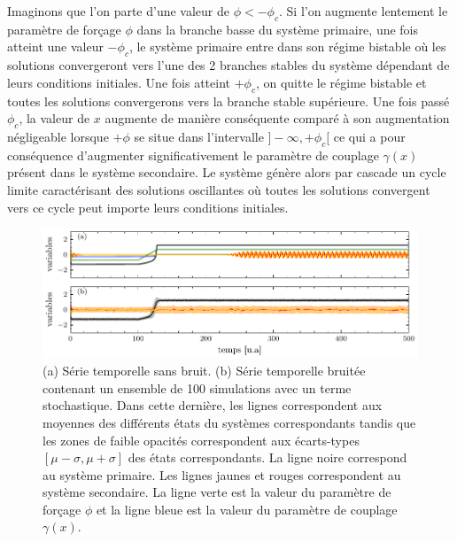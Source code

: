 
Imaginons que l’on parte d’une valeur de $\phi < - \phi_c$. Si l’on augmente lentement le paramètre de forçage $\phi$ dans la branche basse du système primaire, une fois atteint une valeur $-\phi_c$, le système primaire entre dans son régime bistable où les solutions convergeront vers l’une des 2 branches stables du système dépendant de leurs conditions initiales. Une fois atteint $+\phi_c$, on quitte le régime bistable et toutes les solutions convergerons vers la branche stable supérieure. Une fois passé $\phi_c$, la valeur de $x$ augmente de manière conséquente comparé à son augmentation négligeable lorsque $+\phi$ se situe dans l’intervalle $]-\infty, +\phi_c[$ ce qui a pour conséquence d’augmenter significativement le paramètre de couplage $\gamma(x)$ présent dans le système secondaire. Le système génère alors par cascade un cycle limite caractérisant des solutions oscillantes où toutes les solutions convergent vers ce cycle peut importe leurs conditions initiales.

\begin{figure}[ht!]
  \centering
  \includegraphics{figures/time-series.pdf}
  \caption{(a) Série temporelle sans bruit. (b) Série temporelle bruitée contenant un ensemble de 100 simulations avec un terme stochastique. Dans cette dernière, les lignes correspondent aux moyennes des différents états du systèmes correspondants tandis que les zones de faible opacités correspondent aux écarts-types $[\mu - \sigma, \mu + \sigma]$ des états correspondants. La ligne noire correspond au système primaire. Les lignes jaunes et rouges correspondent au système secondaire. La ligne verte est la valeur du paramètre de forçage $\phi$ et la ligne bleue est la valeur du paramètre de couplage $\gamma(x)$.}
  \label{fig:time-series}
\end{figure}

